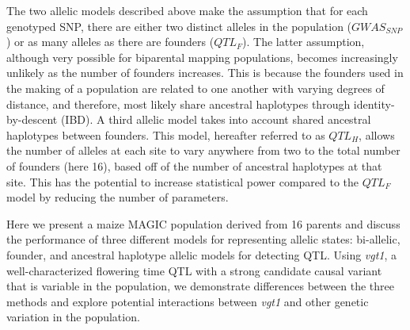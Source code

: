 \documentclass[article,9pt,twocolumn,twoside]{rilabRxiv}
\newcommand{\jri}[1]{{\small \textcolor{red}{#1}}}
\begin{document}

The two allelic models described above make the assumption that for each genotyped SNP, there are either two distinct alleles in the population ($GWAS_{SNP}$) or as many alleles as there are founders ($QTL_F$).
The latter assumption, although very possible for biparental mapping populations, becomes increasingly unlikely as the number of founders increases.
This is because the founders used in the making of a population are related to one another with varying degrees of distance, and therefore, most likely share ancestral haplotypes through identity-by-descent (IBD).
A third allelic model takes into account shared ancestral haplotypes between founders.
This model, hereafter referred to as $QTL_H$, allows the number of alleles at each site to vary anywhere from two to the total number of founders (here 16), based off of the number of ancestral haplotypes at that site.
This has the potential to increase statistical power compared to the $QTL_F$ model by reducing the number of parameters.

Here we present a maize MAGIC population derived from 16 parents and discuss the performance of three different models for representing allelic states: bi-allelic, founder, and ancestral haplotype allelic models for detecting QTL. %
Using \emph{vgt1}, a well-characterized flowering time QTL with a strong candidate causal variant that is variable in the population, we demonstrate differences between the three methods and explore potential interactions between \emph{vgt1} and other genetic variation in the population.
\end{document}
